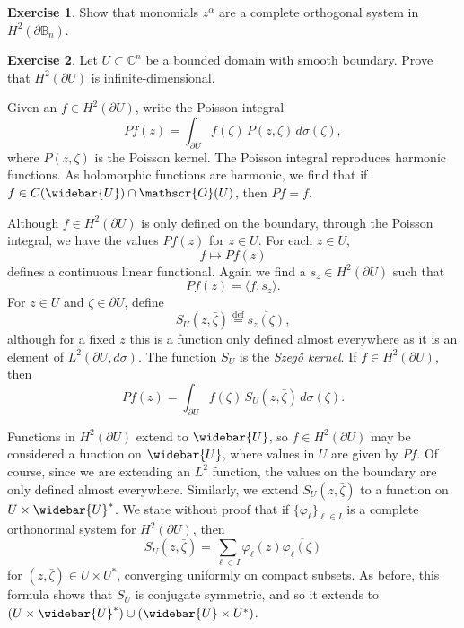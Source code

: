 \documentclass[12pt,openany]{book}
\newcommand{\linnprod}[2]{\langle #1 , #2 \rangle}
\newcommand{\C}{{\mathbb{C}}}
\newcommand{\bB}{{\mathbb{B}}}
\newcommand{\sO}{{\mathscr{O}}}
\newcommand{\myindex}[1]{#1\index{#1}}
\theoremstyle{plain}
\theoremstyle{remark}
\theoremstyle{definition}
\newenvironment{exbox}{%
    \def\FrameCommand{\vrule width 1pt \relax\hspace{10pt}}%
    \MakeFramed{\advance\hsize-\width\FrameRestore}%
}{%
    \endMakeFramed
}
\theoremstyle{exercise}
\newtheorem{exercise}{Exercise}[section]
\theoremstyle{example}
\begin{document}
\begin{exbox}
\begin{exercise}
Show that monomials $z^\alpha$ are a complete orthogonal system in
$H^2(\partial \bB_n)$.
\end{exercise}

\begin{exercise}
Let $U \subset \C^n$ be a bounded domain with smooth boundary.
Prove that
$H^2(\partial U)$ is infinite-dimensional.
\end{exercise}
\end{exbox}

Given an $f \in H^2(\partial U)$, write the Poisson integral
\begin{equation*}
Pf(z) = \int_{\partial U} f(\zeta) \, P(z,\zeta) \, d \sigma(\zeta) ,
\end{equation*}
where $P(z,\zeta)$ is the Poisson kernel.  The Poisson integral
reproduces harmonic functions.  As holomorphic functions are harmonic, we
find that if $f \in C(\widebar{U}) \cap \sO(U)$, then $Pf = f$.

Although $f \in H^2(\partial U)$ is only defined on the boundary,
through the Poisson integral, we have the values
$Pf(z)$ for $z \in U$.
For each $z \in U$,
\begin{equation*}
f \mapsto Pf(z)
\end{equation*}
defines a continuous linear functional.  Again we find a $s_z \in
H^2(\partial U)$ such that
\begin{equation*}
Pf(z) = \linnprod{f}{s_z} .
\end{equation*}
For $z \in U$ and $\zeta \in \partial U$, define
%
\begin{equation*}
S_U(z,\bar{\zeta}) \overset{\text{def}}{=} \overline{s_z(\zeta)} ,
\end{equation*}
although for a fixed $z$ this is a function only defined almost everywhere
as it is an element of $L^2(\partial U,d\sigma)$.
The function $S_U$ is the \emph{\myindex{Szeg{\H{o}} kernel}}.
If $f \in H^2(\partial U)$, then
\begin{equation*}
Pf(z) = \int_{\partial U} f(\zeta) \, S_U(z,\bar{\zeta}) \, d\sigma(\zeta) .
\end{equation*}

Functions in $H^2(\partial U)$ extend to $\widebar{U}$,
so $f \in H^2(\partial U)$ may be considered a function on
$\widebar{U}$, where values in $U$ are given by $Pf$.
Of course, since we are extending an $L^2$ function, the values
on the boundary are only defined almost everywhere.
Similarly, we
extend $S_U(z,\bar{\zeta})$ to a function on $U \times \widebar{U}^*$.
We state without proof that if $\{ \varphi_\ell \}_{\ell\in I}$ is a complete
orthonormal system for $H^2(\partial U)$, then
\begin{equation} \label{eq:formulaszego}
S_U(z,\bar{\zeta}) = \sum_{\ell \in I} \varphi_\ell(z)\overline{\varphi_\ell(\zeta)}
\end{equation}
for $(z,\bar{\zeta}) \in U \times U^*$, converging uniformly on compact subsets.
As before, this formula shows that $S_U$ is conjugate symmetric,
and so it extends to
$(U \times \widebar{U}^*) \cup (\widebar{U} \times U^*)$.
\end{document}
